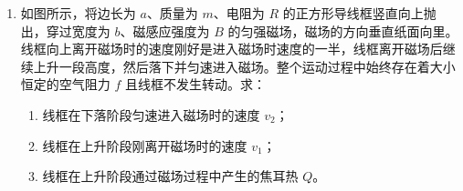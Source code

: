 \documentclass[\gkver]{gaokaozhenti}
\begin{document}
\begin{enumerate}
{得 $a_{1}t_{1}=a_{2}t_{2}$ 或 $2a_{1}=1.25a_{2}$ ①

$a_{1}=\frac{F\cos\theta-mg\sin\theta-\mu(F\sin\theta+mg\cos\theta)}{m}$ ②

$a_{2}=\frac{mg\sin\theta+\mu mg\cos\theta}{m}$ ③

由①，②，③式联立解得：$\mu=0.25$ ④

代入②，③得：$a_{1}=5\Umsq$，$a_{2}=8\Umsq$。

物体的总位移为

$s=\frac{1}{2}a_{1}t_{1}^{2}+\frac{1}{2}a_{2}t_{2}^{2}$ ⑤

$=0.5\times5\times2^{2}+0.5\times8\times1.25^{2}=16.25\Um$ ⑥
}

\item
如图所示，将边长为 $a$、质量为 $m$、电阻为 $R$ 的正方形导线框竖直向上抛出，穿过宽度为 $b$、磁感应强度为 $B$ 的匀强磁场，磁场的方向垂直纸面向里。线框向上离开磁场时的速度刚好是进入磁场时速度的一半，线框离开磁场后继续上升一段高度，然后落下并匀速进入磁场。整个运动过程中始终存在着大小恒定的空气阻力 $f$ 且线框不发生转动。求：

\begin{enumerate}
	\item
	线框在下落阶段匀速进入磁场时的速度 $v_{2}$；
	\item
	线框在上升阶段刚离开磁场时的速度 $v_{1}$；
	\item
	线框在上升阶段通过磁场过程中产生的焦耳热 $Q$。
\end{enumerate}

\onepicture[align=right, w=5.50cm]{}


\end{enumerate}
\end{document}
